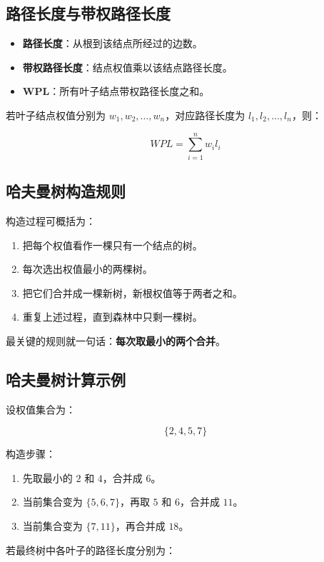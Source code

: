 \documentclass{../../note}
\begin{document}
\subsection{路径长度与带权路径长度}

\begin{itemize}
  \item \textbf{路径长度}：从根到该结点所经过的边数。
  \item \textbf{带权路径长度}：结点权值乘以该结点路径长度。
  \item \textbf{WPL}：所有叶子结点带权路径长度之和。
\end{itemize}

若叶子结点权值分别为 $w_1, w_2, \dots, w_n$，对应路径长度为 $l_1, l_2, \dots, l_n$，则：

\[
WPL = \sum_{i=1}^{n} w_i l_i
\]

\subsection{哈夫曼树构造规则}

构造过程可概括为：

\begin{enumerate}
  \item 把每个权值看作一棵只有一个结点的树。
  \item 每次选出权值最小的两棵树。
  \item 把它们合并成一棵新树，新根权值等于两者之和。
  \item 重复上述过程，直到森林中只剩一棵树。
\end{enumerate}

最关键的规则就一句话：\textbf{每次取最小的两个合并}。

\subsection{哈夫曼树计算示例}

设权值集合为：

\[
\{2, 4, 5, 7\}
\]

构造步骤：

\begin{enumerate}
  \item 先取最小的 $2$ 和 $4$，合并成 $6$。
  \item 当前集合变为 $\{5, 6, 7\}$，再取 $5$ 和 $6$，合并成 $11$。
  \item 当前集合变为 $\{7, 11\}$，再合并成 $18$。
\end{enumerate}

若最终树中各叶子的路径长度分别为：
\end{document}
